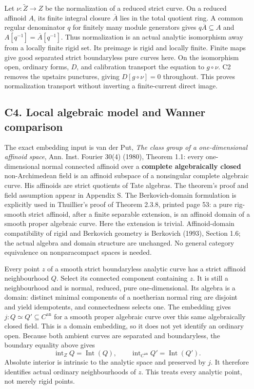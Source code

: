 \documentclass[
  10pt,
]{article}
\begin{document}
Let \(\nu:\widetilde Z\to Z\) be the normalization of a reduced strict
curve. On a reduced affinoid \(A\), its finite integral closure
\(\overline A\) lies in the total quotient ring. A common regular
denominator \(q\) for finitely many module generators gives
\(q\overline A\subseteq A\) and \(A[q^{-1}]=\overline A[q^{-1}]\). Thus
normalization is an actual analytic isomorphism away from a locally
finite rigid set. Its preimage is rigid and locally finite. Finite maps
give good separated strict boundaryless pure curves here. On the
isomorphism open, ordinary forms, \(D\), and calibration transport the
equation to \(g\circ\nu\). C2 removes the upstairs punctures, giving
\(D[g\circ\nu]=0\) throughout. This proves normalization transport
without inverting a finite-current direct image.

\subsection{C4. Local algebraic model and Wanner
comparison}\label{c4.-local-algebraic-model-and-wanner-comparison}

The exact embedding input is van der Put, \emph{The class group of a
one-dimensional affinoid space}, Ann. Inst. Fourier 30(4) (1980),
Theorem 1.1: every one-dimensional normal connected affinoid over a
\textbf{complete algebraically closed} non-Archimedean field is an
affinoid subspace of a nonsingular complete algebraic curve. His
affinoids are strict quotients of Tate algebras. The theorem's proof and
field assumption appear in Appendix S. The Berkovich-domain formulation
is explicitly used in Thuillier's proof of Theorem 2.3.8, printed page
53: a pure rig-smooth strict affinoid, after a finite separable
extension, is an affinoid domain of a smooth proper algebraic curve.
Here the extension is trivial. Affinoid-domain compatibility of rigid
and Berkovich geometry is Berkovich (1993), Section 1.6; the actual
algebra and domain structure are unchanged. No general category
equivalence on nonparacompact spaces is needed.

Every point \(z\) of a smooth strict boundaryless analytic curve has a
strict affinoid neighbourhood \(Q\). Select its connected component
containing \(z\). It is still a neighbourhood and is normal, reduced,
pure one-dimensional. Its algebra is a domain: distinct minimal
components of a noetherian normal ring are disjoint and yield
idempotents, and connectedness selects one. The embedding gives
\(j:Q\simeq Q'\subseteq C^{\mathrm{an}}\) for a smooth proper algebraic
curve over this same algebraically closed field. This is a domain
embedding, so it does not yet identify an ordinary open. Because both
ambient curves are separated and boundaryless, the boundary equality
above gives \[
 \operatorname{int}_Z Q=\operatorname{Int}(Q),\qquad
 \operatorname{int}_{C^{\mathrm{an}}}Q'=\operatorname{Int}(Q').
\] Absolute interior is intrinsic to the analytic space and preserved by
\(j\). It therefore identifies actual ordinary neighbourhoods of \(z\).
This treats every analytic point, not merely rigid points.
\end{document}
